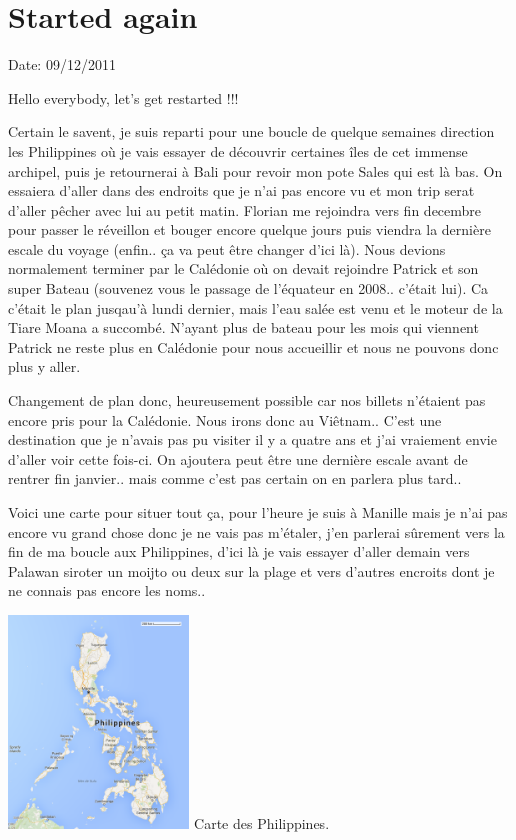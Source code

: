 \section{Started again}

Date: 09/12/2011

\begin{multicols}{2}

Hello everybody, let's get restarted !!!

Certain le savent, je suis reparti pour une boucle de quelque semaines direction les Philippines où je vais essayer de découvrir certaines îles de cet immense archipel, puis je retournerai à Bali pour revoir mon pote Sales qui est là bas. On essaiera d'aller dans des endroits que je n'ai pas encore vu et mon trip serat d'aller pêcher avec lui au petit matin. Florian me rejoindra vers fin decembre pour passer le réveillon et bouger encore quelque jours puis viendra la dernière escale du voyage (enfin.. ça va peut être changer d'ici là). Nous devions normalement terminer par le Calédonie où on devait rejoindre Patrick et son super Bateau (souvenez vous le passage de l'équateur en 2008.. c'était lui). Ca c'était le plan jusqau'à lundi dernier, mais l'eau salée est venu et le moteur de la Tiare Moana a succombé. N'ayant plus de bateau pour les mois qui viennent Patrick ne reste plus en Calédonie pour nous accueillir et nous ne pouvons donc plus y aller.

Changement de plan donc, heureusement possible car nos billets n'étaient pas encore pris pour la Calédonie. Nous irons donc au Viêtnam.. C'est une destination que je n'avais pas pu visiter il y a quatre ans et j'ai vraiement envie d'aller voir cette fois-ci. On ajoutera peut être une dernière escale avant de rentrer fin janvier.. mais comme c'est pas certain on en parlera plus tard..

Voici une carte pour situer tout ça, pour l'heure je suis à Manille mais je n'ai pas encore vu grand chose donc je ne vais pas m'étaler, j'en parlerai sûrement vers la fin de ma boucle aux Philippines, d'ici là je vais essayer d'aller demain vers Palawan siroter un moijto ou deux sur la plage et vers d'autres encroits dont je ne connais pas encore les noms..

\hspace*{-0.65cm}
\includegraphics[width=4.8cm]{articles/Started-again/philippines.png}
Carte des Philippines.


\end{multicols}
